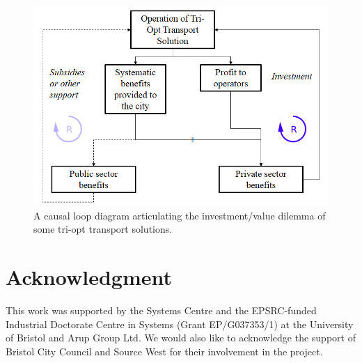 \documentclass[journal]{IEEEtran}
\begin{document}
\begin{figure}[!htb]
\centering
\includegraphics[width=\columnwidth]{images/causalloop.png}
\caption{A causal loop diagram articulating the investment/value
  dilemma of some tri-opt transport solutions.}
\label{fig:causalloop}
\end{figure}






\section*{Acknowledgment}

This work was supported by the Systems Centre and the EPSRC-funded
Industrial Doctorate Centre in Systems (Grant EP/G037353/1) at the
University of Bristol and Arup Group Ltd. We would also like to
acknowledge the support of Bristol City Council and Source West for
their involvement in the project.
\end{document}
